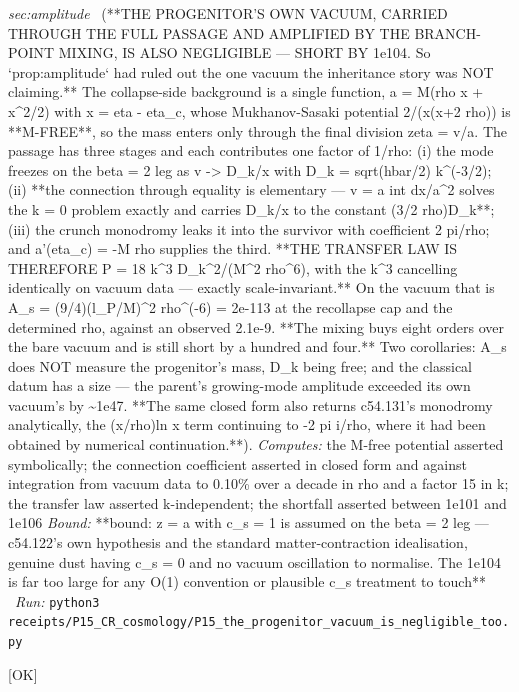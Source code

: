 \begin{description}
\textit{sec:amplitude} \ (**THE PROGENITOR'S OWN VACUUM, CARRIED THROUGH THE FULL PASSAGE AND AMPLIFIED BY THE BRANCH-POINT MIXING, IS ALSO NEGLIGIBLE --- SHORT BY 1e104. So `prop:amplitude` had ruled out the one vacuum the inheritance story was NOT claiming.** The collapse-side background is a single function, a = M(rho x + x\textasciicircum{}2/2) with x = \textbar{}eta - eta\_c\textbar{}, whose Mukhanov-Sasaki potential 2/(x(x+2 rho)) is **M-FREE**, so the mass enters only through the final division zeta = v/a. The passage has three stages and each contributes one factor of 1/rho: (i) the mode freezes on the beta = 2 leg as v -> D\_k/x with D\_k = sqrt(hbar/2) k\textasciicircum{}(-3/2); (ii) **the connection through equality is elementary --- v = a int dx/a\textasciicircum{}2 solves the k = 0 problem exactly and carries D\_k/x to the constant (3/2 rho)D\_k**; (iii) the crunch monodromy leaks it into the survivor with coefficient 2 pi/rho; and a'(eta\_c) = -M rho supplies the third. **THE TRANSFER LAW IS THEREFORE P = 18 k\textasciicircum{}3 D\_k\textasciicircum{}2/(M\textasciicircum{}2 rho\textasciicircum{}6), with the k\textasciicircum{}3 cancelling identically on vacuum data --- exactly scale-invariant.** On the vacuum that is A\_s = (9/4)(l\_P/M)\textasciicircum{}2 rho\textasciicircum{}(-6) = 2e-113 at the recollapse cap and the determined rho, against an observed 2.1e-9. **The mixing buys eight orders over the bare vacuum and is still short by a hundred and four.** Two corollaries: A\_s does NOT measure the progenitor's mass, D\_k being free; and the classical datum has a size --- the parent's growing-mode amplitude exceeded its own vacuum's by \textasciitilde{}1e47. **The same closed form also returns c54.131's monodromy analytically, the (x/rho)ln x term continuing to -2 pi i/rho, where it had been obtained by numerical continuation.**). 
\emph{Computes:} the M-free potential asserted symbolically; the connection coefficient asserted in closed form and against integration from vacuum data to 0.10\% over a decade in rho and a factor 15 in k; the transfer law asserted k-independent; the shortfall asserted between 1e101 and 1e106
 \emph{Bound:} **bound: z = a with c\_s = 1 is assumed on the beta = 2 leg --- c54.122's own hypothesis and the standard matter-contraction idealisation, genuine dust having c\_s = 0 and no vacuum oscillation to normalise. The 1e104 is far too large for any O(1) convention or plausible c\_s treatment to touch**
\ \emph{Run:} \texttt{python3 receipts/P15\_CR\_cosmology/P15\_the\_progenitor\_vacuum\_is\_negligible\_too.py}
\item[\rcptlabel{P15_no_primordial_B_modes_unconditionally}{P15R89}\textbf{P15R89}\quad\texttt{P15\_no\_primordial\_B\_modes\_unconditionally}]\hfill\textsf{[OK]}\\

\end{description}
